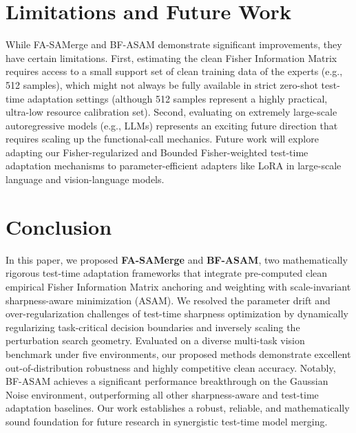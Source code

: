 \documentclass{article}
\theoremstyle{plain}
\theoremstyle{definition}
\theoremstyle{remark}
\begin{document}
\section{Limitations and Future Work}
\label{sec:limitations}
While FA-SAMerge and BF-ASAM demonstrate significant improvements, they have certain limitations. First, estimating the clean Fisher Information Matrix requires access to a small support set of clean training data of the experts (e.g., 512 samples), which might not always be fully available in strict zero-shot test-time adaptation settings (although 512 samples represent a highly practical, ultra-low resource calibration set). Second, evaluating on extremely large-scale autoregressive models (e.g., LLMs) represents an exciting future direction that requires scaling up the functional-call mechanics. Future work will explore adapting our Fisher-regularized and Bounded Fisher-weighted test-time adaptation mechanisms to parameter-efficient adapters like LoRA in large-scale language and vision-language models.

\section{Conclusion}
\label{sec:conclusion}
In this paper, we proposed \textbf{FA-SAMerge} and \textbf{BF-ASAM}, two mathematically rigorous test-time adaptation frameworks that integrate pre-computed clean empirical Fisher Information Matrix anchoring and weighting with scale-invariant sharpness-aware minimization (ASAM). We resolved the parameter drift and over-regularization challenges of test-time sharpness optimization by dynamically regularizing task-critical decision boundaries and inversely scaling the perturbation search geometry. Evaluated on a diverse multi-task vision benchmark under five environments, our proposed methods demonstrate excellent out-of-distribution robustness and highly competitive clean accuracy. Notably, BF-ASAM achieves a significant performance breakthrough on the Gaussian Noise environment, outperforming all other sharpness-aware and test-time adaptation baselines. Our work establishes a robust, reliable, and mathematically sound foundation for future research in synergistic test-time model merging.



\end{document}
